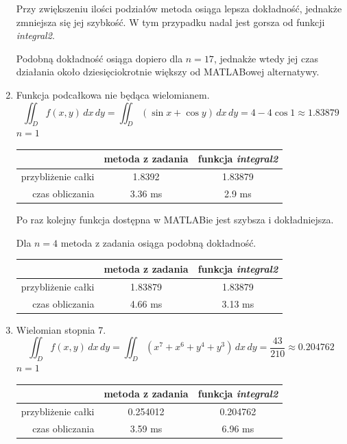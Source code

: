 \documentclass[12pt]{article}
\begin{document}
\begin{enumerate}[label=\textbf{Przykład \arabic*}]
		Przy zwiększeniu ilości podziałów metoda osiąga lepsza dokładność, jednakże zmniejsza się jej szybkość. W tym przypadku nadal jest gorsza od funkcji \textit{integral2}.
		
		Podobną dokładność osiąga dopiero dla $n = 17$, jednakże wtedy jej czas działania około dziesięciokrotnie większy od MATLABowej alternatywy.
		
		
		\item
		Funkcja podcałkowa nie będąca wielomianem.
		$$\iint_D f(x, y) \,dx\,dy = \iint_D (\sin x + \cos y) \,dx\,dy = 4 - 4\cos 1 \approx 1.83879$$
		$n = 1$
		
		\begin{table}[H]
			\centering
			\begin{tabular}{|r|c|c|}
				\hline
				                   & metoda z zadania & funkcja \textit{integral2} \\ \hline
				przybliżenie całki &      1.8392      &          1.83879           \\ \hline
				   czas obliczania &     3.36 ms      &           2.9 ms           \\ \hline
			\end{tabular}
		\end{table}
		
		Po raz kolejny funkcja dostępna w MATLABie jest szybsza i dokładniejsza.
		
		Dla $n = 4$ metoda z zadania osiąga podobną dokładność.
		\begin{table}[H]
			\centering
			\begin{tabular}{|r|c|c|}
				\hline
				                   & metoda z zadania & funkcja \textit{integral2} \\ \hline
				przybliżenie całki &     1.83879      &          1.83879           \\ \hline
				   czas obliczania &     4.66 ms      &          3.13 ms           \\ \hline
			\end{tabular}
		\end{table}
	
	
	
		\item
		Wielomian stopnia 7.
		$$\iint_D f(x, y) \,dx\,dy = \iint_D (x^7 + x^6 + y^4 + y^3) \,dx\,dy = \frac{43}{210} \approx 0.204762$$
		$n = 1$
		
		\begin{table}[H]
			\centering
			\begin{tabular}{|r|c|c|}
				\hline
				                   & metoda z zadania & funkcja \textit{integral2} \\ \hline
				przybliżenie całki &     0.254012     & 0.204762                   \\ \hline
				   czas obliczania &     3.59 ms      & 6.96 ms                    \\ \hline
			\end{tabular}
		\end{table}
	

\end{enumerate}
\end{document}
